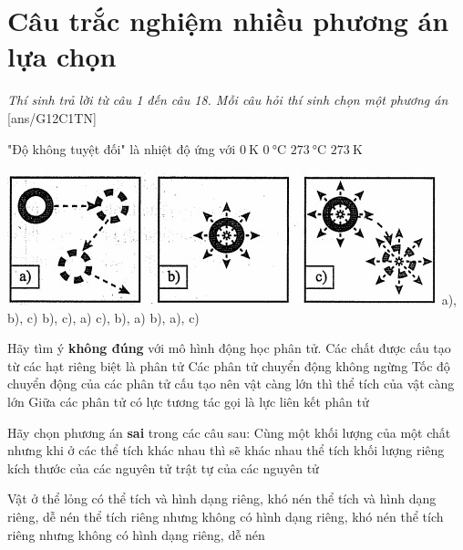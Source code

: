 \setcounter{section}{0}
\section{Câu trắc nghiệm nhiều phương án lựa chọn}
\textit{Thí sinh trả lời từ câu 1 đến câu 18. Mỗi câu hỏi thí sinh chọn một phương án}
\setcounter{ex}{0}
[ans/G12C1TN]
\begin{ex}
	"Độ không tuyệt đối" là nhiệt độ ứng với
	\choice
	{\True $\SI{0}{\kelvin}$}
	{$\SI{0}{\celsius}$}
	{$\SI{273}{\celsius}$}
	{$\SI{273}{\kelvin}$}
	\loigiai{
	}
	\end{ex}
\begin{ex}
{\includegraphics[scale=0.7]{figs/G12-C1-4}
}
\choice
{a), b), c)}
{\True b), c), a)}
{c), b), a)}
{b), a), c)}
	\loigiai{}
\end{ex}
\begin{ex}
	Hãy tìm ý \textbf{không đúng} với mô hình động học phân tử.
	\choice
	{Các chất được cấu tạo từ các hạt riêng biệt là phân tử}
	{Các phân tử chuyển động không ngừng}
	{\True Tốc độ chuyển động của các phân tử cấu tạo nên vật càng lớn thì thể tích của vật càng lớn}
	{Giữa các phân tử có lực tương tác gọi là lực liên kết phân tử}
	\loigiai{}
\end{ex}
\begin{ex}
	Hãy chọn phương án \textbf{sai} trong các câu sau: Cùng một khối lượng của một chất nhưng khi ở các thể tích khác nhau thì sẽ khác nhau
	\choice
	{thể tích}
	{khối lượng riêng}
	{\True kích thước của các nguyên tử}
	{trật tự của các nguyên tử}
	\loigiai{}
\end{ex}


\begin{ex}
Vật ở thể lỏng có	
	\choice
	{thể tích và hình dạng riêng, khó nén}
	{thể tích và hình dạng riêng, dễ nén}
	{\True thể tích riêng nhưng không có hình dạng riêng, khó nén}
	{thể tích riêng nhưng không có hình dạng riêng, dễ nén}
	\loigiai{}
\end{ex}

